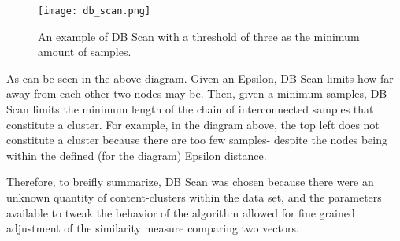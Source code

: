 \begin{figure}[H]
  \centering
  \texttt{[image: db\_scan.png]}
  \caption{An example of DB Scan with a threshold of three as the minimum amount of samples.}
\end{figure}

As can be seen in the above diagram. Given an Epsilon, DB Scan limits
how far away from each other two nodes may be. Then, given a minimum
samples, DB Scan limits the minimum length of the chain of
interconnected samples that constitute a cluster. For example, in the
diagram above, the top left does not constitute a cluster because
there are too few samples- despite the nodes being within the defined
(for the diagram) Epsilon distance.

Therefore, to breifly summarize, DB Scan was chosen because there were
an unknown quantity of content-clusters within the data set, and the
parameters available to tweak the behavior of the algorithm allowed
for fine grained adjustment of the similarity measure comparing two
vectors.
